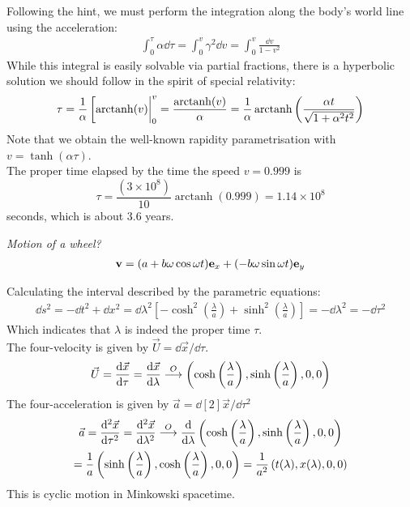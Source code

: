 \documentclass{report}
\DeclareMathOperator{\arctanh}{arctanh}
\begin{document}
\begin{subquests}
\begin{subquests}
		\item		
		Following the hint, we must perform the integration along the body's world line using the acceleration:
		\begin{gather*}
			\int^{\tau}_0\alpha\dd{\tau} =  \int^v_0 \gamma^2\dd{v} = \int^v_0 \frac{\dd{v}}{1-v^2}
		\end{gather*}
		While this integral is easily solvable via partial fractions, there is a hyperbolic solution we should follow in the spirit of special relativity:
		\begin{gather*}
			\tau = \frac{1}{\alpha}\eval[\arctanh(v)|^v_0 = \frac{\arctanh(v)}{\alpha} = \frac{1}{\alpha}\arctanh \left(\frac{\alpha t}{\sqrt{1 + \alpha^2 t^2}}\right)
		\end{gather*}
		Note that we obtain the well-known rapidity parametrisation with $v = \tanh (\alpha \tau)$. \\
		The proper time elapsed by the time the speed $v = 0.999$ is $$\tau = \frac{\left(3 \times 10^8\right)}{10}\arctanh(0.999) = 1.14 \times 10^8$$ seconds, which is about 3.6 years.
	\end{subquests}

	\item \emph{Motion of a wheel?}
	\begin{gather*}
		\vb{v} = \pqty{a + b\omega \cos \omega t}\vb{e}_{x} + \pqty{-b\omega\sin \omega t}\vb{e}_y
	\end{gather*}

	\item \emph{}
	Calculating the interval described by the parametric equations:
	\begin{gather*}
		\dd{s^{2}} = - \dd{t^{2}} + \dd{x^{2}} = \dd{\lambda^2}\left[-\cosh^2\left(\frac{\lambda}{a}\right) + \sinh^2\left(	\frac{\lambda}{a}\right)\right] = -\dd{\lambda^{2}} = -\dd{\tau^{2}}
	\end{gather*}
	Which indicates that $\lambda$ is indeed the proper time $\tau$. \\
	The four-velocity is given by $\vec U = \dd{\vec x}/\dd{\tau}$.
	\begin{gather*}
		\vec U = \dv{\vec x}{\tau} = \dv{\vec x}{\lambda} \stackrel{O} \longrightarrow
		\left(\cosh\left(\frac{\lambda}{a}\right), \sinh\left(\frac{\lambda}{a}\right), 0, 0 \right) 
	\end{gather*}
	The four-acceleration is given by $\vec a = \dd[2]{\vec x}/\dd{\tau}^2$
	\begin{gather*}
		\vec a = \dv[2]{\vec x}{\tau} = \dv[2]{\vec x}{\lambda} \stackrel{O} \longrightarrow \dv{\lambda}\left(\cosh\left(\frac{\lambda}{a}\right), \sinh\left(\frac{\lambda}{a}\right), 0, 0 \right) \\ = \frac{1}{a} \left(\sinh\left(\frac{\lambda}{a}\right), \cosh\left(\frac{\lambda}{a}\right), 0, 0 \right) = \frac{1}{a^2}\left(t(\lambda), x(\lambda), 0, 0\right)
	\end{gather*}
	This is cyclic motion in Minkowski spacetime.


\end{subquests}
\end{document}
